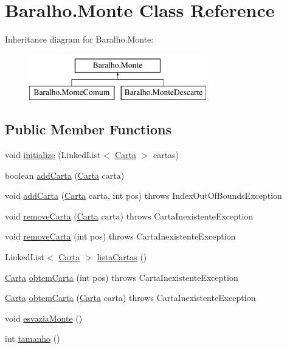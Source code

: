 \hypertarget{class_baralho_1_1_monte}{
\section{\-Baralho.\-Monte \-Class \-Reference}
\label{class_baralho_1_1_monte}
}
\-Inheritance diagram for \-Baralho.\-Monte\-:\begin{figure}[H]
\begin{center}
\leavevmode
\includegraphics[height=2.000000cm]{class_baralho_1_1_monte}
\end{center}
\end{figure}
\subsection*{\-Public \-Member \-Functions}
\begin{DoxyCompactItemize}
\item 
void \hyperlink{class_baralho_1_1_monte_a9c0e60ff3e5adee7c73311dc639b726d}{initialize} (\-Linked\-List$<$ \hyperlink{class_baralho_1_1_carta}{\-Carta} $>$ cartas)
\item 
boolean \hyperlink{class_baralho_1_1_monte_a62727fc8f2a5df78acf7ed256907d18d}{add\-Carta} (\hyperlink{class_baralho_1_1_carta}{\-Carta} carta)
\item 
void \hyperlink{class_baralho_1_1_monte_a54573fe9edbac3f8d9fca1fe1199debb}{add\-Carta} (\hyperlink{class_baralho_1_1_carta}{\-Carta} carta, int pos)  throws Index\-Out\-Of\-Bounds\-Exception
\item 
void \hyperlink{class_baralho_1_1_monte_a64abc4bdca4718cb5e615154c562cf85}{remove\-Carta} (\hyperlink{class_baralho_1_1_carta}{\-Carta} carta)  throws Carta\-Inexistente\-Exception
\item 
void \hyperlink{class_baralho_1_1_monte_a81b0e1160db4914f5b1ba51fc068b1b9}{remove\-Carta} (int pos)  throws Carta\-Inexistente\-Exception 
\item 
\-Linked\-List$<$ \hyperlink{class_baralho_1_1_carta}{\-Carta} $>$ \hyperlink{class_baralho_1_1_monte_a586ca35231a6c8a8634600df898f5ccc}{lista\-Cartas} ()
\item 
\hyperlink{class_baralho_1_1_carta}{\-Carta} \hyperlink{class_baralho_1_1_monte_adeda515ad018d4975fbf054a37ab0f36}{obtem\-Carta} (int pos)  throws Carta\-Inexistente\-Exception
\item 
\hyperlink{class_baralho_1_1_carta}{\-Carta} \hyperlink{class_baralho_1_1_monte_ad724ab32986fbbc07e3d492aecfa2037}{obtem\-Carta} (\hyperlink{class_baralho_1_1_carta}{\-Carta} carta)  throws Carta\-Inexistente\-Exception 
\item 
void \hyperlink{class_baralho_1_1_monte_abd353fab5c3bfe77a070aafe7d905bec}{esvazia\-Monte} ()
\item 
int \hyperlink{class_baralho_1_1_monte_a8768f18eb0e16b7a2be665360ad4afb5}{tamanho} ()
\end{DoxyCompactItemize}


